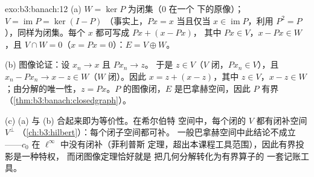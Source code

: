\begin{solution}{exo:b3:banach:12}
(a) $W = \ker P$ 为闭集（$0$ 在一个
下的原像）；$V = \operatorname{im}P = \ker(I - P)$
（事实上，$Px = x$ 当且仅当 $x \in \operatorname{im}P$，利用 $P^2 =
P$），同样为闭集。每个 $x$ 都可写成 $Px + (x - Px)$，
其中 $Px \in V$，$x - Px \in W$，且 $V \cap W = 0$（$x = Px
= 0$）：$E = V \oplus W$。

(b) 图像论证：设 $x_n \to x$ 且 $Px_n \to z$。
于是 $z \in V$（$V$ 闭，$Px_n \in V$），且 $x_n - Px_n \to
x - z \in W$（$W$ 闭）。因此 $x = z + (x - z)$，其中 $z \in
V$，$x - z \in W$；由分解的唯一性，$z =
Px$。$P$ 的图像闭，$E$ 是巴拿赫空间，因此 $P$
有界（\cref{thm:b3:banach:closedgraph}）。

(c) (a) 与 (b) 合起来即为等价性。在希尔伯特
空间中，每个闭的 $V$ 都有闭补空间 $V^\perp$
（\cref{ch:b3:hilbert}）：每个闭子空间都可补。
一般巴拿赫空间中此结论不成立——$c_0$
在 $\ell^\infty$ 中没有闭补（菲利普斯
定理，超出本课程工具范围），因此有界投影是一种特权，
而闭图像定理恰好就是
把几何分解转化为有界算子的
一套记账工具。
\end{solution}

